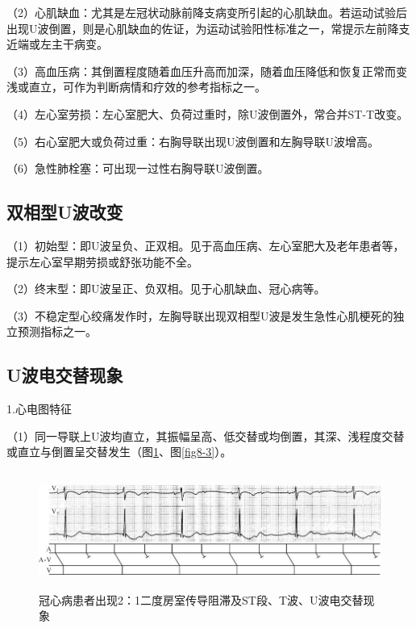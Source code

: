 （2）心肌缺血：尤其是左冠状动脉前降支病变所引起的心肌缺血。若运动试验后出现U波倒置，则是心肌缺血的佐证，为运动试验阳性标准之一，常提示左前降支近端或左主干病变。

（3）高血压病：其倒置程度随着血压升高而加深，随着血压降低和恢复正常而变浅或直立，可作为判断病情和疗效的参考指标之一。

（4）左心室劳损：左心室肥大、负荷过重时，除U波倒置外，常合并ST-T改变。

（5）右心室肥大或负荷过重：右胸导联出现U波倒置和左胸导联U波增高。

（6）急性肺栓塞：可出现一过性右胸导联U波倒置。

\protect\hypertarget{text00014.htmlux5cux23subid112}{}{}

\subsection{双相型U波改变}

（1）初始型：即U波呈负、正双相。见于高血压病、左心室肥大及老年患者等，提示左心室早期劳损或舒张功能不全。

（2）终末型：即U波呈正、负双相。见于心肌缺血、冠心病等。

（3）不稳定型心绞痛发作时，左胸导联出现双相型U波是发生急性心肌梗死的独立预测指标之一。

\protect\hypertarget{text00014.htmlux5cux23subid113}{}{}

\subsection{U波电交替现象}

1.心电图特征

（1）同一导联上U波均直立，其振幅呈高、低交替或均倒置，其深、浅程度交替或直立与倒置呈交替发生（图\ref{fig8-2}、图\ref{fig8-3}）。

\begin{figure}[!htbp]
 \centering
 \includegraphics[width=5.76042in,height=1.51042in]{./images/Image00121.jpg}
 \captionsetup{justification=centering}
 \caption{冠心病患者出现2：1二度房室传导阻滞及ST段、T波、U波电交替现象}
 \label{fig8-2}
  \end{figure} 

